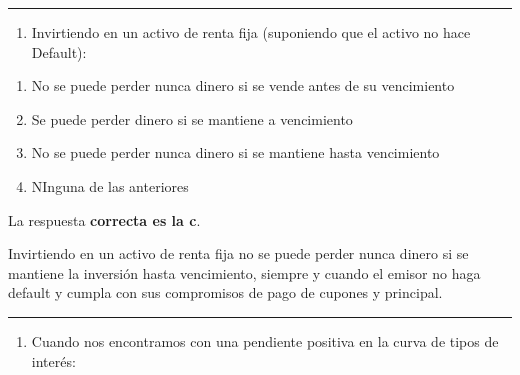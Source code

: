 \documentclass[
  letterpaper,
  DIV=11,
  numbers=noendperiod]{scrreprt}
\providecommand{\tightlist}{%
  \setlength{\itemsep}{0pt}\setlength{\parskip}{0pt}}\usepackage{longtable,booktabs,array}
\begin{document}
\begin{center}\rule{0.5\linewidth}{0.5pt}\end{center}

\begin{enumerate}
\def\labelenumi{\arabic{enumi}.}
\setcounter{enumi}{79}
\tightlist
\item
  Invirtiendo en un activo de renta fija (suponiendo que el activo no
  hace Default):
\end{enumerate}

\begin{enumerate}
\def\labelenumi{\alph{enumi})}
\item
  No se puede perder nunca dinero si se vende antes de su vencimiento
\item
  Se puede perder dinero si se mantiene a vencimiento
\item
  No se puede perder nunca dinero si se mantiene hasta vencimiento
\item
  NInguna de las anteriores
\end{enumerate}

\begin{tcolorbox}[enhanced jigsaw, left=2mm, opacityback=0, colback=white, breakable, arc=.35mm, bottomrule=.15mm, rightrule=.15mm, toprule=.15mm, leftrule=.75mm, colframe=quarto-callout-tip-color-frame]
\begin{minipage}[t]{5.5mm}
\textcolor{quarto-callout-tip-color}{\faLightbulb}
\end{minipage}%
\begin{minipage}[t]{\textwidth - 5.5mm}

La respuesta \textbf{correcta es la c}.

Invirtiendo en un activo de renta fija no se puede perder nunca dinero
si se mantiene la inversión hasta vencimiento, siempre y cuando el
emisor no haga default y cumpla con sus compromisos de pago de cupones y
principal.

\end{minipage}%
\end{tcolorbox}

\begin{center}\rule{0.5\linewidth}{0.5pt}\end{center}

\begin{enumerate}
\def\labelenumi{\arabic{enumi}.}
\setcounter{enumi}{80}
\tightlist
\item
  Cuando nos encontramos con una pendiente positiva en la curva de tipos
  de interés:
\end{enumerate}
\end{document}
